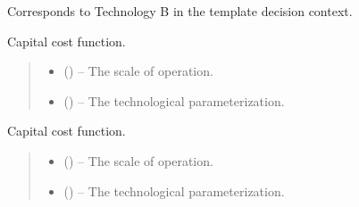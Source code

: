 \documentclass[letterpaper,10pt,english]{sphinxmanual}
\begin{document}
\sphinxAtStartPar
Corresponds to Technology B in the template decision context.

\begin{fulllineitems}
\label{\detokenize{technology:technology.technology_m_model.capital_cost}}
\pysigstartsignatures
{}
\pysigstopsignatures
\sphinxAtStartPar
Capital cost function.
\begin{quote}\begin{description}
\begin{itemize}
\item {} 
\sphinxAtStartPar
{} () – The scale of operation.

\item {} 
\sphinxAtStartPar
{} () – The technological parameterization.

\end{itemize}

\end{description}\end{quote}

\end{fulllineitems}


\begin{fulllineitems}
\label{\detokenize{technology:technology.technology_m_model.fixed_cost}}
\pysigstartsignatures
{}
\pysigstopsignatures
\sphinxAtStartPar
Capital cost function.
\begin{quote}\begin{description}
\begin{itemize}
\item {} 
\sphinxAtStartPar
{} () – The scale of operation.

\item {} 
\sphinxAtStartPar
{} () – The technological parameterization.

\end{itemize}

\end{description}\end{quote}

\end{fulllineitems}
\end{document}
